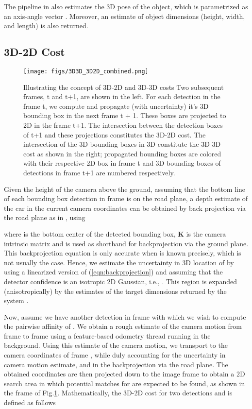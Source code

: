 \documentclass[letterpaper, 10 pt, conference]{ieeeconf}
\begin{document}
The pipeline in \cite{KM_ICRA} also estimates the 3D pose of the object, which is parametrized as an axis-angle vector . Moreover, an estimate of object dimensions (height, width, and length) is also returned.


\subsection{3D-2D Cost}

\begin{figure}[!t]
  \centering
  \texttt{[image: figs/3D3D\_3D2D\_combined.png]}
  \caption{Illustrating the concept of 3D-2D and 3D-3D costs Two subsequent frames, t and t+1, are shown in the left. For each detection in the frame t, we compute and propagate (with uncertainty) it’s 3D bounding box in the next frame t + 1. These boxes are projected to 2D in the frame t+1. The intersection between the detection boxes of t+1 and these projections constitutes the 3D-2D cost. The intersection of the 3D bounding boxes in 3D constitute the 3D-3D cost as shown in the right; propagated bounding boxes are colored with their respective 2D box in frame t and 3D bounding boxes of  detections in frame t+1 are numbered respectively.}
  \label{fig:3d2d}
\end{figure}

Given the height  of the camera above the ground, assuming that the bottom line of each bounding box detection  in frame  is on the road plane, a depth estimate of the car in the current camera coordinates can be obtained by back projection via the road plane as in \cite{chandraker2015}, using 

where  is the bottom center of the detected bounding box, \textbf{K} is the camera intrinsic matrix and  is used as shorthand for backprojection via the ground plane. This backprojection equation is only accurate when  is known precisely, which is not usually the case. Hence, we estimate the uncertainty in 3D location of  by using a linearized version of (\ref{eqn:backprojection}) and assuming that the detector confidence is an isotropic 2D Gaussian, i.e., . This region is expanded (anisotropically) by the estimates of the target dimensions returned by the system \cite{KM_ICRA}.

Now, assume we have another detection  in frame  with which we wish to compute the pairwise affinity of . We obtain a rough estimate of the camera motion from frame  to frame  using a feature-based odometry thread running in the background. Using this estimate of the camera motion, we transport  to the camera coordinates of frame , while duly accounting for the uncertainty in camera motion estimate, and in the backprojection via the road plane. The obtained coordinates  are then projected down to the image frame  to obtain a 2D search area in which potential matches for  are expected to be found, as shown in the  frame  of Fig.\ref{fig:3d2d}. Mathematically, the 3D-2D cost for two detections  and  is defined as follows
\end{document}
